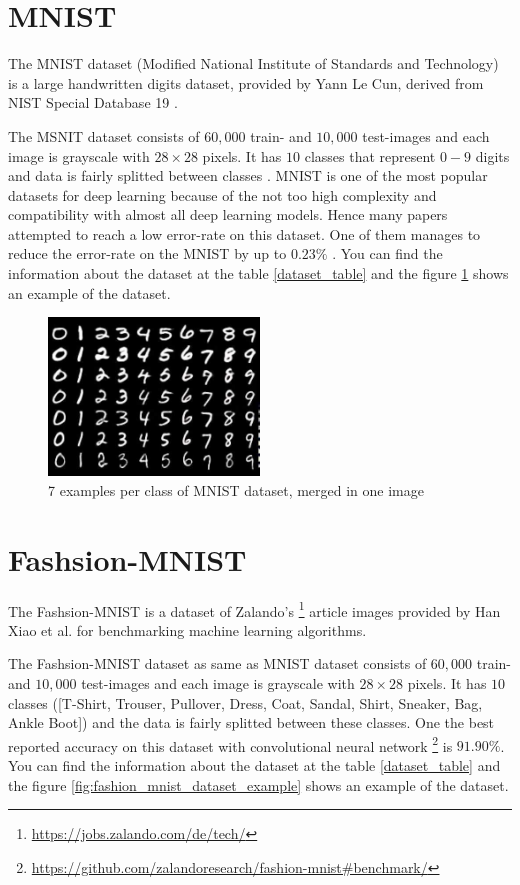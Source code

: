 \section{MNIST}
The MNIST dataset (Modified National Institute of Standards and Technology) is a large handwritten
digits dataset, provided by Yann Le Cun, derived from NIST Special Database 19 \cite{NIST}.

The MSNIT dataset consists of $60,000$ train- and $10,000$ test-images and each image is grayscale
with $28 \times 28$ pixels. It has $10$ classes that represent $0-9$ digits and data is fairly
splitted between classes \cite{MNIST_data_reference}. MNIST is one of the most popular datasets for
deep learning because of the not too high complexity and compatibility with almost all deep learning
models. Hence many papers attempted to reach a low error-rate on this dataset. One of them manages
to reduce the error-rate on the MNIST by up to $0.23\%$ \cite{MNIST_best_result_reference}. You can
find the information about the dataset at the table
\ref{dataset_table} and the figure \ref{fig:mnist_dataset_example} shows an example of the dataset.

\begin{figure}
  \centering
  \label{fig:mnist_dataset_example}
  \includegraphics[width=0.5\textwidth]{fig/mnist}
  \caption{7 examples per class of MNIST dataset, merged in one image \cite{MNIST_dataset_example}}
\end{figure}


\section{Fashsion-MNIST}
The Fashsion-MNIST is a dataset of Zalando's \footnote{\url{https://jobs.zalando.com/de/tech/}}
article images provided by Han Xiao et al. \cite{Fashion_MNIST_reference} for benchmarking machine learning algorithms.

The Fashsion-MNIST dataset as same as MNIST dataset consists of $60,000$ train- and $10,000$ test-images and each image is grayscale
with $28 \times 28$ pixels. It has $10$ classes ([T-Shirt, Trouser, Pullover, Dress, Coat,
    Sandal, Shirt, Sneaker, Bag, Ankle Boot]) and the data is fairly
splitted between these classes. One the best reported accuracy on this dataset with convolutional neural
network \footnote{\url{https://github.com/zalandoresearch/fashion-mnist\#benchmark/}} is $91.90\%$. You can
find the information about the dataset at the table
\ref{dataset_table} and the figure \ref{fig:fashion_mnist_dataset_example} shows an example of the dataset.


